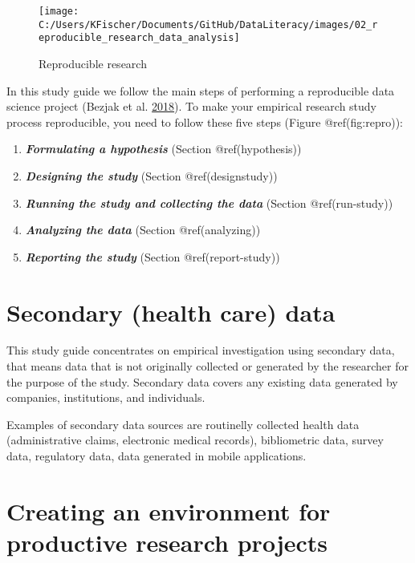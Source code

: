\documentclass[
]{book}
\providecommand{\tightlist}{%
  \setlength{\itemsep}{0pt}\setlength{\parskip}{0pt}}
\begin{document}
\begin{figure}

{\centering \texttt{[image: C:/Users/KFischer/Documents/GitHub/DataLiteracy/images/02\_reproducible\_research\_data\_analysis]} 

}

\caption{Reproducible research}\label{fig:repro}
\end{figure}

In this study guide we follow the main steps of performing a
reproducible data science project (Bezjak et al.
\protect\hyperlink{ref-bezjak_open_2018}{2018}). To make your empirical
research study process reproducible, you need to follow these five steps
(Figure @ref(fig:repro)):

\begin{enumerate}
\def\labelenumi{\arabic{enumi}.}
\tightlist
\item
  \textbf{\emph{Formulating a hypothesis}} (Section @ref(hypothesis))
\item
  \textbf{\emph{Designing the study}} (Section @ref(designstudy))
\item
  \textbf{\emph{Running the study and collecting the data}} (Section
  @ref(run-study))
\item
  \textbf{\emph{Analyzing the data}} (Section @ref(analyzing))
\item
  \textbf{\emph{Reporting the study}} (Section @ref(report-study))
\end{enumerate}

\hypertarget{secondary-health-care-data}{%
\section{Secondary (health care)
data}\label{secondary-health-care-data}}

This study guide concentrates on empirical investigation using secondary
data, that means data that is not originally collected or generated by
the researcher for the purpose of the study. Secondary data covers any
existing data generated by companies, institutions, and individuals.

Examples of secondary data sources are routinelly collected health data
(administrative claims, electronic medical records), bibliometric data,
survey data, regulatory data, data generated in mobile applications.

\hypertarget{creating-an-environment-for-productive-research-projects}{%
\section{Creating an environment for productive research
projects}\label{creating-an-environment-for-productive-research-projects}}
\end{document}
